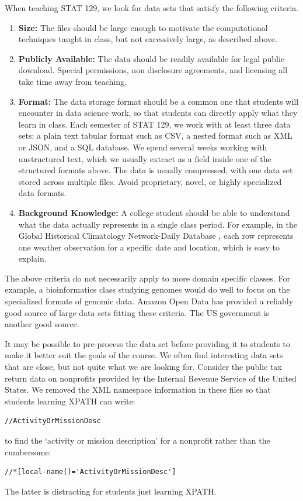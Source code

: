 \documentclass[12pt]{article}
\begin{document}
When teaching STAT 129, we look for data sets that satisfy the following criteria.
\begin{enumerate}
\item \textbf{Size:} The files should be large enough to motivate the computational techniques taught in class, but not excessively large, as described above.
\item \textbf{Publicly Available:} The data should be readily available for legal public download.
	Special permissions, non disclosure agreements, and licensing all take time away from teaching.
\item \textbf{Format:} 
    The data storage format should be a common one that students will encounter in data science work, so that students can directly apply what they learn in class.
    Each semester of STAT 129, we work with at least three data sets: a plain text tabular format such as CSV, a nested format such as XML or JSON, and a SQL database.
    We spend several weeks working with unstructured text, which we usually extract as a field inside one of the structured formats above.
    The data is usually compressed, with one data set stored across multiple files.
	Avoid proprietary, novel, or highly specialized data formats.
\item \textbf{Background Knowledge:}
    A college student should be able to understand what the data actually represents in a single class period.
    For example, in the Global Historical Climatology Network-Daily Database \cite{menne2012overview}, each row represents one weather observation for a specific date and location, which is easy to explain.
\end{enumerate}
The above criteria do not necessarily apply to more domain specific classes. 
For example, a bioinformatics class studying genomes would do well to focus on the specialized formats of genomic data.
Amazon Open Data \cite{aws-opendata} has provided a reliably good source of large data sets fitting these criteria.
The US government \cite{data-gov} is another good source.

It may be possible to pre-process the data set before providing it to students to make it better suit the goals of the course.
We often find interesting data sets that are close, but not quite what we are looking for.
Consider the public tax return data on nonprofits provided by the Internal Revenue Service of the United States\cite{irs990}.
We removed the XML namespace information in these files so that students learning XPATH can write:
\begin{verbatim}
//ActivityOrMissionDesc
\end{verbatim}
to find the `activity or mission description' for a nonprofit rather than the cumbersome:
\begin{verbatim}
//*[local-name()='ActivityOrMissionDesc']
\end{verbatim}
The latter is distracting for students just learning XPATH.
\end{document}
